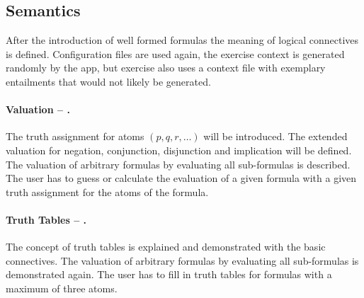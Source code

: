 
%



%


\subsection{Semantics}

After the introduction of well formed formulas the meaning of logical connectives is defined.
Configuration files are used again, the exercise context is generated randomly by the app, 
but exercise  
also uses a context file with exemplary entailments that would not likely be generated.

\paragraph{Valuation – .}
\label{tut:31}
The truth assignment for atoms $(p,q,r,…)$ will be introduced. 
The extended valuation for negation, conjunction, disjunction and implication will be defined.
The valuation of arbitrary formulas by evaluating all sub-formulas is described.
The user has to guess or calculate the evaluation of a given formula with a given truth assignment for the atoms of the formula.

\paragraph{Truth Tables – .}
\label{tut:32}
The concept of truth tables is explained and demonstrated with the basic connectives. 
The valuation of arbitrary formulas by evaluating all sub-formulas is demonstrated again.
The user has to fill in truth tables for formulas with a maximum of three atoms.

